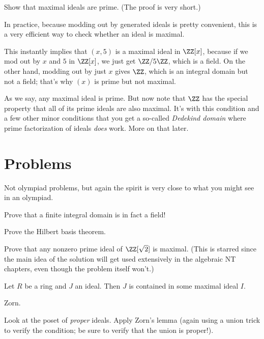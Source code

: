 \begin{ques}
	Show that maximal ideals are prime.
	(The proof is very short.)
\end{ques}

In practice, because modding out by generated ideals is pretty convenient,
this is a very efficient way to check whether an ideal is maximal.
\begin{example}
	\listhack
	\begin{enumerate}[(a)]
		\ii This instantly implies that $(x,5)$ is a maximal ideal
		in $\ZZ[x]$, because if we mod out by $x$ and $5$ in $\ZZ[x]$,
		we just get $\ZZ/5\ZZ$, which is a field.
		\ii On the other hand, modding out by just $x$ gives $\ZZ$,
		which is an integral domain but not a field; that's why $(x)$ is
		prime but not maximal.
	\end{enumerate}
\end{example}

As we say, any maximal ideal is prime.
But now note that $\ZZ$ has the special property that
all of its prime ideals are also maximal.
It's with this condition and a few other minor conditions
that you get a so-called \emph{Dedekind domain}
where prime factorization of ideals \emph{does} work.
More on that later.

\section{Problems}
Not olympiad problems, but again the spirit is very close
to what you might see in an olympiad.

\begin{sproblem}
	Prove that a finite integral domain is in fact a field!
	\label{prob:finite_domain_field}
\end{sproblem}
\begin{problem}
	Prove the Hilbert basis theorem.
\end{problem}
\begin{sproblem}
	Prove that any nonzero prime ideal of $\ZZ[\sqrt 2]$ is maximal.
	(This is starred since the main idea of the solution will get used extensively in
	the algebraic NT chapters, even though the problem itself won't.)
	\label{prob:dedekind_sample}
\end{sproblem}

\begin{problem}
	Let $R$ be a ring and $J$ an ideal.
	Then $J$ is contained in some maximal ideal $I$.
	\begin{hint}
		Zorn.
	\end{hint}
	\begin{sol}
		Look at the poset of \emph{proper} ideals.
		Apply Zorn's lemma (again using a union trick to verify the condition;
		be sure to verify that the union is proper!).
	\end{sol}
\end{problem}

